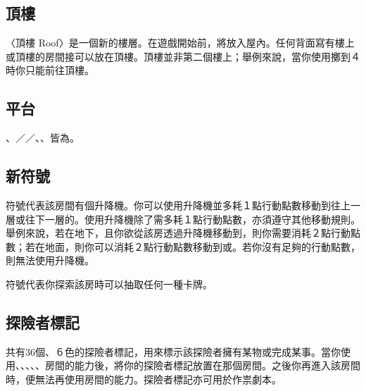 
\subsection{頂樓}

〈頂樓 Roof〉是一個新的樓層。在遊戲開始前，將放入屋內。任何背面寫有樓上或頂樓的房間接可以放在頂樓。頂樓並非第二個樓上；舉例來說，當你使用擲到４時你只能前往頂樓。


\subsection{平台}

、／／、、皆為。


\subsection{新符號}

\DumbwaiterSymbol{}符號代表該房間有個升降機。你可以使用升降機並多耗１點行動點數移動到往上一層或往下一層的。使用升降機除了需多耗１點行動點數，亦須遵守其他移動規則。舉例來說，若在地下，且你欲從該房透過升降機移動到，則你需要消耗２點行動點數；若在地面，則你可以消耗２點行動點數移動到或。若你沒有足夠的行動點數，則無法使用升降機。

\QuestionSymbol{}符號代表你探索該房時可以抽取任何一種卡牌。


\subsection{探險者標記}

共有36個、６色的探險者標記，用來標示該探險者擁有某物或完成某事。當你使用、、、、、房間的能力後，將你的探險者標記放置在那個房間。之後你再進入該房間時，便無法再使用房間的能力。探險者標記亦可用於作祟劇本。

